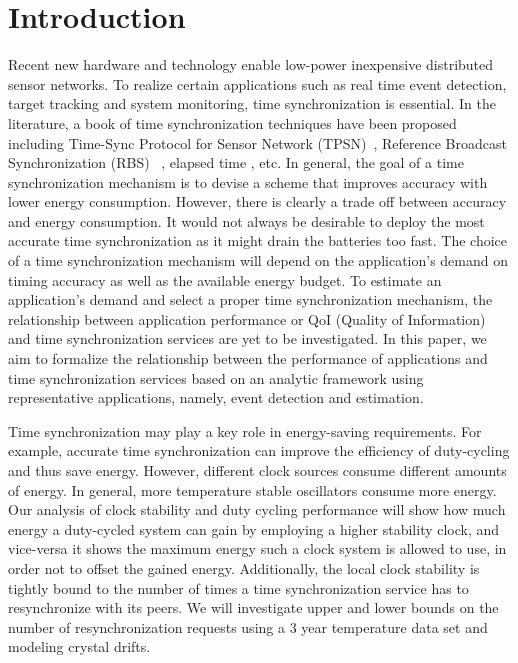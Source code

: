 \section{Introduction}
Recent new hardware and technology enable low-power inexpensive
distributed sensor networks. To realize certain applications such as
real time event detection, target tracking and system monitoring,
time synchronization is essential. In the literature, a book of time
synchronization techniques have been proposed including Time-Sync
Protocol for Sensor Network (TPSN)~\cite{ganeriwal03timingsync},
Reference Broadcast Synchronization (RBS)
~\cite{elson02finegrained}, elapsed time \cite{kusy05elapsed}, etc.
In general, the goal of a time synchronization mechanism is to
devise a scheme that improves accuracy with lower energy
consumption. However, there is clearly a trade off between accuracy and
energy consumption. It would not always be desirable to deploy the
most accurate time synchronization as it might drain the batteries too fast. The
choice of a time synchronization mechanism will depend on the
application's demand on timing accuracy as well as the available energy
budget. To estimate an application's demand and select a proper time
synchronization mechanism, the relationship between application
performance or QoI (Quality of Information) and time synchronization
services are yet to be investigated. In this paper, we aim to
formalize the relationship between the performance of applications
and time synchronization services based on an analytic framework using
representative applications, namely, event detection and estimation.


Time synchronization may play a key role in energy-saving requirements. For
example, accurate time synchronization can improve the efficiency of
duty-cycling and thus save energy. However, different clock sources consume
different amounts of energy. In general, more temperature stable oscillators
consume more energy. Our analysis of clock stability and duty cycling
performance will show how much energy a duty-cycled system can gain by employing
a higher stability clock, and vice-versa it shows the maximum energy such a
clock system is allowed to use, in order not to offset the gained energy.
Additionally, the local clock stability is tightly bound to the number of times
a time synchronization service has to resynchronize with its peers. We will
investigate upper and lower bounds on the number of resynchronization requests
using a 3 year temperature data set and modeling crystal drifts.


